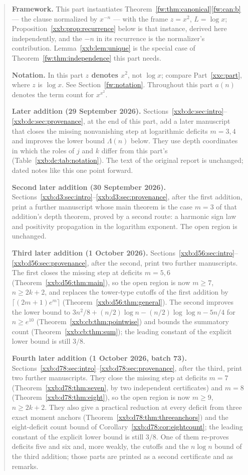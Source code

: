 \documentclass[11pt,a4paper]{article}
\numberwithin{equation}{section}
\theoremstyle{definition}
\theoremstyle{remark}
\theoremstyle{plain}
\begin{document}
\begin{quote}\small
\textbf{Framework.}  This part instantiates
Theorem~\ref{fw:thm:canonical}\ref{fw:can:b} --- the clause normalized by
$x^{-n}$ --- with the frame $z=x^2$, $L=\log x$;
Proposition~\ref{xxb:prop:recurrence} below is that instance, derived here
independently, and the $-n$ in its recurrence is the normalizer's contribution.
Lemma~\ref{xxb:lem:unique} is the special case of
Theorem~\ref{fw:thm:independence} this part needs.

\smallskip
\textbf{Notation.}  In this part \textbf{$z$ denotes $x^2$}, not $\log x$;
compare Part~\ref{xxc:part}, where $z$ is $\log x$.  See
Section~\ref{fw:notation}.  Throughout this part $a(n)$ denotes the term count
for $x^{x^2}$.

\smallskip
\textbf{Later addition (29 September 2026).}  Sections~\ref{xxb:dc:sec:intro}--\ref{xxb:dc:sec:provenance},
at the end of this part, add a later manuscript that closes the missing
nonvanishing step at logarithmic deficits $m=3,4$ and improves the lower bound
$\Lambda(n)$ below.  They use depth coordinates in which the roles of $j$ and $k$
differ from this part's (Table~\ref{xxb:dc:tab:notation}).  The text of the
original report is unchanged; dated notes like this one point forward.

\smallskip
\textbf{Second later addition (30 September 2026).}
Sections~\ref{xxb:d3:sec:intro}--\ref{xxb:d3:sec:provenance}, after the
first addition, print a further manuscript whose main theorem is the case
$m=3$ of that addition's depth theorem, proved by a second route: a harmonic
sign law and positivity propagation in the logarithm exponent.  The open
region is unchanged.

\smallskip
\textbf{Third later addition (1 October 2026).}
Sections~\ref{xxb:d56:sec:intro}--\ref{xxb:d56:sec:provenance}, after the
second, print two further manuscripts.  The first closes the missing step at
deficits $m=5,6$ (Theorem~\ref{xxb:d56:thm:main}), so the open region is now
$m\ge7$, $n\ge2k+2$, and replaces the tower-type cutoffs of the first addition
by $\lceil(2m+1)e^m\rceil$ (Theorem~\ref{xxb:d56:thm:general}).  The second
improves the lower bound to $3n^2/8+(n/2)\log n-(n/2)\log\log n-5n/4$ for
$n\ge e^{10}$ (Theorem~\ref{xxb:cb:thm:pointwise}) and bounds the summatory
count (Theorem~\ref{xxb:cb:thm:sum}); the leading constant of the explicit
lower bound is still $3/8$.

\smallskip
\textbf{Fourth later addition (1 October 2026, batch 73).}
Sections~\ref{xxb:d78:sec:intro}--\ref{xxb:d78:sec:provenance}, after the
third, print two further manuscripts.  They close the missing step at
deficits $m=7$ (Theorem~\ref{xxb:d78:thm:seven}, by two independent
certificates) and $m=8$ (Theorem~\ref{xxb:d78:thm:eight}), so the open region
is now $m\ge9$, $n\ge2k+2$.  They also give a practical reduction at every
deficit from three exact moment anchors
(Theorem~\ref{xxb:d78:thm:threeanchors}) and the eight-deficit count bound of
Corollary~\ref{xxb:d78:cor:eightcount}; the leading constant of the explicit
lower bound is still $3/8$.  One of them re-proves deficits five and six and,
more weakly, the cutoffs and the $n\log n$ bound of the third addition; those
parts are printed as a second certificate and as remarks.


\end{quote}
\end{document}
